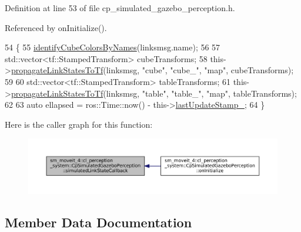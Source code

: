 Definition at line 53 of file cp\+\_\+simulated\+\_\+gazebo\+\_\+perception.\+h.



Referenced by on\+Initialize().


\begin{DoxyCode}
54             \{
55                 \hyperlink{classsm__moveit__4_1_1cl__perception__system_1_1CpSimulatedGazeboPerception_aac02fd742b0074f62d8909ce00a02d3b}{identifyCubeColorsByNames}(linksmsg.name);
56 
57                 std::vector<tf::StampedTransform> cubeTransforms;
58                 this->\hyperlink{classsm__moveit__4_1_1cl__perception__system_1_1CpSimulatedGazeboPerception_a643fa78620216085ca385b74832a0abc}{propagateLinkStatesToTf}(linksmsg, \textcolor{stringliteral}{"cube"}, \textcolor{stringliteral}{"cube\_"}, \textcolor{stringliteral}{"map"}, 
      cubeTransforms);
59 
60                 std::vector<tf::StampedTransform> tableTransforms;
61                 this->\hyperlink{classsm__moveit__4_1_1cl__perception__system_1_1CpSimulatedGazeboPerception_a643fa78620216085ca385b74832a0abc}{propagateLinkStatesToTf}(linksmsg, \textcolor{stringliteral}{"table"}, \textcolor{stringliteral}{"table\_"}, \textcolor{stringliteral}{"map"}, 
      tableTransforms);
62 
63                 \textcolor{keyword}{auto} ellapsed = ros::Time::now() - this->\hyperlink{classsm__moveit__4_1_1cl__perception__system_1_1CpSimulatedGazeboPerception_afa9d8a4f636cf06bd7dbe49ce2ca5fa8}{lastUpdateStamp\_};
64             \}
\end{DoxyCode}
Here is the caller graph for this function\+:
\nopagebreak
\begin{figure}[H]
\begin{center}
\leavevmode
\includegraphics[width=350pt]{classsm__moveit__4_1_1cl__perception__system_1_1CpSimulatedGazeboPerception_a7914ffd20518c866a8a1e11254589d12_icgraph}
\end{center}
\end{figure}


\subsection{Member Data Documentation}
\mbox{\label{classsm__moveit__4_1_1cl__perception__system_1_1CpSimulatedGazeboPerception_a5f043c05aa335a438459a55b51e6ace6}} 
